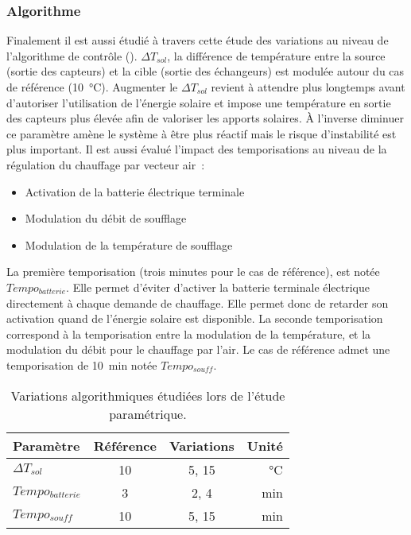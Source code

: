 \subsubsection{Algorithme} %
\label{ssub:variations_algorithmiques}
Finalement il est aussi étudié à travers cette étude des variations au niveau de
l’algorithme de contrôle (). $\Delta T_{sol}$, la différence de
température entre la source (sortie des capteurs) et la cible (sortie des échangeurs) est
modulée autour du cas de référence (\SI{10}{\celsius}). Augmenter le $\Delta T_{sol}$
revient à attendre plus longtemps avant d’autoriser l’utilisation de l’énergie solaire et
impose une température en sortie des capteurs plus élevée afin de valoriser les apports
solaires. À l’inverse diminuer ce paramètre amène le système à être plus réactif mais le
risque d’instabilité est plus important. Il est aussi évalué l’impact des
temporisations au niveau de la régulation du chauffage par vecteur air~:
\begin{itemize}
  \item Activation de la batterie électrique terminale
  \item Modulation du débit de soufflage
  \item Modulation de la température de soufflage
\end{itemize}
La première temporisation (trois minutes pour le cas de référence), est notée
$Tempo_{batterie}$. Elle permet d’éviter d’activer la batterie terminale électrique
directement à chaque demande de chauffage. Elle permet donc de retarder son activation
quand de l’énergie solaire est disponible. La seconde temporisation correspond à la temporisation
entre la modulation de la température, et la modulation du débit pour le chauffage par
l’air. Le cas de référence admet une temporisation de \SI{10}{min} notée $Tempo_{souff}$.

\begin{table}
\centering
\caption[Variations algorithmiques étudiées lors de l’étude paramétrique]
        {Variations algorithmiques étudiées lors de l’étude paramétrique.}
\label{tab:variations_algo}
\begin{tabular}{l c c r}
    \toprule
    Paramètre          & Référence & Variations          & Unité         \\
    \midrule
    $\Delta T_{sol}$     & \num{10}  & \num{5}, \num{15}   & \si{\celsius} \\
    $Tempo_{batterie}$ & \num{3}   & \num{2}, \num{4}    & \si{min}      \\
    $Tempo_{souff}$    & \num{10}  & \num{5}, \num{15}   & \si{min}      \\
    \bottomrule
\end{tabular}
\end{table}



